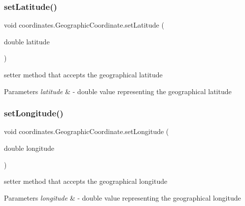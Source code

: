 \subsubsection{\texorpdfstring{set\+Latitude()}{setLatitude()}}
{\footnotesize\ttfamily void coordinates.\+Geographic\+Coordinate.\+set\+Latitude (\begin{DoxyParamCaption}\item[{double}]{latitude }\end{DoxyParamCaption})}



setter method that accepts the geographical latitude 


\begin{DoxyParams}{Parameters}
{\em latitude} & -\/ double value representing the geographical latitude \\
\hline
\end{DoxyParams}
\mbox{\label{classcoordinates_1_1_geographic_coordinate_a72cfb2c3bcafcee1eff0da6b8e9da8fb}} 
\subsubsection{\texorpdfstring{set\+Longitude()}{setLongitude()}}
{\footnotesize\ttfamily void coordinates.\+Geographic\+Coordinate.\+set\+Longitude (\begin{DoxyParamCaption}\item[{double}]{longitude }\end{DoxyParamCaption})}



setter method that accepts the geographical longitude 


\begin{DoxyParams}{Parameters}
{\em longitude} & -\/ double value representing the geographical longitude \\
\hline
\end{DoxyParams}
\mbox{\label{classcoordinates_1_1_geographic_coordinate_a60674b3195f4470485e62005e90eb141}} 
